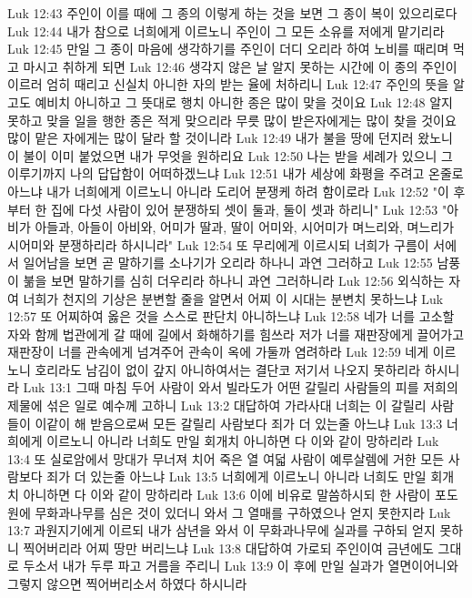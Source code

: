Luk 12:43  주인이 이를 때에 그 종의 이렇게 하는 것을 보면 그 종이 복이 있으리로다
Luk 12:44  내가 참으로 너희에게 이르노니 주인이 그 모든 소유를 저에게 맡기리라
Luk 12:45  만일 그 종이 마음에 생각하기를 주인이 더디 오리라 하여 노비를 때리며 먹고 마시고 취하게 되면
Luk 12:46  생각지 않은 날 알지 못하는 시간에 이 종의 주인이 이르러 엄히 때리고 신실치 아니한 자의 받는 율에 처하리니
Luk 12:47  주인의 뜻을 알고도 예비치 아니하고 그 뜻대로 행치 아니한 종은 많이 맞을 것이요
Luk 12:48  알지 못하고 맞을 일을 행한 종은 적게 맞으리라 무릇 많이 받은자에게는 많이 찾을 것이요 많이 맡은 자에게는 많이 달라 할 것이니라
Luk 12:49  내가 불을 땅에 던지러 왔노니 이 불이 이미 붙었으면 내가 무엇을 원하리요
Luk 12:50  나는 받을 세례가 있으니 그 이루기까지 나의 답답함이 어떠하겠느냐
Luk 12:51  내가 세상에 화평을 주려고 온줄로 아느냐 내가 너희에게 이르노니 아니라 도리어 분쟁케 하려 함이로라
Luk 12:52  "이 후부터 한 집에 다섯 사람이 있어 분쟁하되 셋이 둘과, 둘이 셋과 하리니"
Luk 12:53  "아비가 아들과, 아들이 아비와, 어미가 딸과, 딸이 어미와, 시어미가 며느리와, 며느리가 시어미와 분쟁하리라 하시니라"
Luk 12:54  또 무리에게 이르시되 너희가 구름이 서에서 일어남을 보면 곧 말하기를 소나기가 오리라 하나니 과연 그러하고
Luk 12:55  남풍이 붊을 보면 말하기를 심히 더우리라 하나니 과연 그러하니라
Luk 12:56  외식하는 자여 너희가 천지의 기상은 분변할 줄을 알면서 어찌 이 시대는 분변치 못하느냐
Luk 12:57  또 어찌하여 옳은 것을 스스로 판단치 아니하느냐
Luk 12:58  네가 너를 고소할 자와 함께 법관에게 갈 때에 길에서 화해하기를 힘쓰라 저가 너를 재판장에게 끌어가고 재판장이 너를 관속에게 넘겨주어 관속이 옥에 가둘까 염려하라
Luk 12:59  네게 이르노니 호리라도 남김이 없이 갚지 아니하여서는 결단코 저기서 나오지 못하리라 하시니라
Luk 13:1  그때 마침 두어 사람이 와서 빌라도가 어떤 갈릴리 사람들의 피를 저희의 제물에 섞은 일로 예수께 고하니
Luk 13:2  대답하여 가라사대 너희는 이 갈릴리 사람들이 이같이 해 받음으로써 모든 갈릴리 사람보다 죄가 더 있는줄 아느냐
Luk 13:3  너희에게 이르노니 아니라 너희도 만일 회개치 아니하면 다 이와 같이 망하리라
Luk 13:4  또 실로암에서 망대가 무너져 치어 죽은 열 여덟 사람이 예루살렘에 거한 모든 사람보다 죄가 더 있는줄 아느냐
Luk 13:5  너희에게 이르노니 아니라 너희도 만일 회개치 아니하면 다 이와 같이 망하리라
Luk 13:6  이에 비유로 말씀하시되 한 사람이 포도원에 무화과나무를 심은 것이 있더니 와서 그 열매를 구하였으나 얻지 못한지라
Luk 13:7  과원지기에게 이르되 내가 삼년을 와서 이 무화과나무에 실과를 구하되 얻지 못하니 찍어버리라 어찌 땅만 버리느냐
Luk 13:8  대답하여 가로되 주인이여 금년에도 그대로 두소서 내가 두루 파고 거름을 주리니
Luk 13:9  이 후에 만일 실과가 열면이어니와 그렇지 않으면 찍어버리소서 하였다 하시니라
